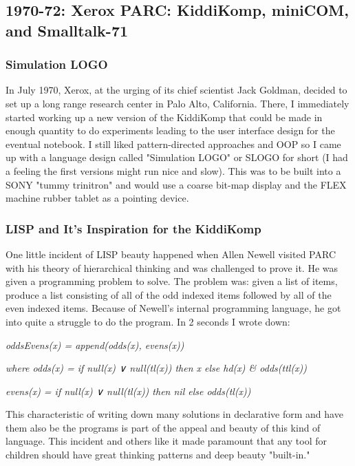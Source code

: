 \documentclass[letterpaper,12pt,parskip=full]{article}
\begin{document}
\subsection{1970-72: Xerox PARC: KiddiKomp, miniCOM, and Smalltalk-71}

\subsubsection{Simulation LOGO}

In July 1970, Xerox, at the urging of its chief scientist Jack Goldman, decided to set up a long range research center in Palo Alto, California. There, I immediately started working up a new version of the KiddiKomp that could be made in enough quantity to do experiments leading to the user interface design for the eventual notebook. I still liked pattern-directed approaches and OOP so I came up with a language design called "Simulation LOGO" or SLOGO for short (I had a feeling the first versions might run nice and slow). This was to be built into a SONY "tummy trinitron" and would use a coarse bit-map display and the FLEX machine rubber tablet as a pointing device.

\subsubsection{LISP and It's Inspiration for the KiddiKomp}

 One little incident of LISP beauty happened when Allen Newell visited PARC with his theory of hierarchical thinking and was challenged to prove it. He was given a programming problem to solve. The problem was: given a list of items, produce a list consisting of all of the odd indexed items followed by all of the even indexed items. Because of Newell's internal programming language, he got into quite a struggle to do the program. In 2 seconds I wrote down:

\textit{oddsEvens(x) = append(odds(x), evens(x))}

\textit{where odds(x) = if null(x) ∨ null(tl(x)) then x else hd(x) \& odds(ttl(x))}
                  
\hspace{30 pt} \textit{evens(x) = if null(x) ∨ null(tl(x)) then nil else odds(tl(x))}

This characteristic of writing down many solutions in declarative form and have them also be the programs is part of the appeal and beauty of this kind of language. This incident and others like it made paramount that any tool for children should have great thinking patterns and deep beauty "built-in." 
\end{document}
